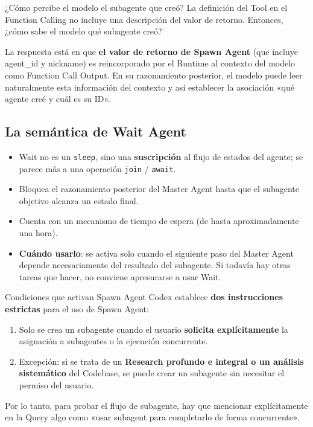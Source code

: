 \documentclass[a4paper]{article}
\begin{document}
\begin{knowledgebox}{¿Cómo percibe el modelo el subagente que creó?}
La definición del Tool en el Function Calling no incluye una descripción del valor de retorno. Entonces, ¿cómo sabe el modelo qué subagente creó?

La respuesta está en que \textbf{el valor de retorno de Spawn Agent} (que incluye agent\_id y nickname) es reincorporado por el Runtime al contexto del modelo como Function Call Output. En su razonamiento posterior, el modelo puede leer naturalmente esta información del contexto y así establecer la asociación «qué agente creé y cuál es su ID».
\end{knowledgebox}

\subsection{La semántica de Wait Agent}

\begin{itemize}
    \item Wait no es un \texttt{sleep}, sino una \textbf{suscripción} al flujo de estados del agente; se parece más a una operación \texttt{join} / \texttt{await}.
    \item Bloquea el razonamiento posterior del Master Agent hasta que el subagente objetivo alcanza un estado final.
    \item Cuenta con un mecanismo de tiempo de espera (de hasta aproximadamente una hora).
    \item \textbf{Cuándo usarlo}: se activa solo cuando el siguiente paso del Master Agent depende necesariamente del resultado del subagente. Si todavía hay otras tareas que hacer, no conviene apresurarse a usar Wait.
\end{itemize}

\begin{importantbox}{Condiciones que activan Spawn Agent}
Codex establece \textbf{dos instrucciones estrictas} para el uso de Spawn Agent:
\begin{enumerate}
    \item Solo se crea un subagente cuando el usuario \textbf{solicita explícitamente} la asignación a subagentes o la ejecución concurrente.
    \item Excepción: si se trata de un \textbf{Research profundo e integral o un análisis sistemático} del Codebase, se puede crear un subagente sin necesitar el permiso del usuario.
\end{enumerate}
Por lo tanto, para probar el flujo de subagente, hay que mencionar explícitamente en la Query algo como «usar subagent para completarlo de forma concurrente».
\end{importantbox}
\end{document}
